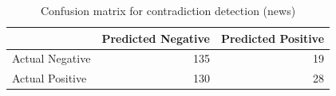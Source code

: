\begin{table}
\caption{Confusion matrix for contradiction detection (news)}
\label{tab:confusion_matrix}
\begin{tabular}{lrr}
\toprule
 & Predicted Negative & Predicted Positive \\
\midrule
Actual Negative & 135 & 19 \\
Actual Positive & 130 & 28 \\
\bottomrule
\end{tabular}
\end{table}

